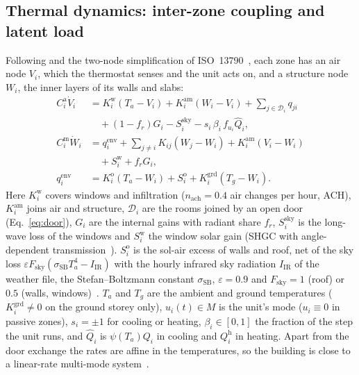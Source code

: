 \documentclass[10pt,a4paper,twocolumn]{article}
\theoremstyle{definition}
\begin{document}
\subsection{Thermal dynamics: inter-zone coupling and latent load}\label{sec:dynamics}
Following \citet{nghiem2012scalable} and the two-node simplification of ISO~13790~\citep{iso13790_2008}, each zone has an air node $V_i$, which the thermostat senses and the unit acts on, and a structure node $W_i$, the inner layers of its walls and slabs:
\begin{subequations}\label{eq:heat}
\begin{align}
C^{\mathrm{a}}_i\dot V_i&=K^{\mathrm{w}}_i(T_a-V_i)+K^{\mathrm{am}}_i(W_i-V_i)+\textstyle\sum_{j\in\mathcal{D}_i}q_{ji}\nonumber\\
&\quad+(1-f_r)G_i-S^{\mathrm{sky}}_i-s_i\,\beta_i\,f_{u_i}\hat Q_i,\label{eq:heat-a}\\
C^{\mathrm{m}}_i\dot W_i&=q^{\mathrm{env}}_i+\textstyle\sum_{j\ne i}K_{ij}(W_j-W_i)+K^{\mathrm{am}}_i(V_i-W_i)\nonumber\\
&\quad+S^{\mathrm{w}}_i+f_rG_i,\label{eq:heat-b}\\
q^{\mathrm{env}}_i&=K^{\mathrm{o}}_i(T_a-W_i)+S^{\mathrm{o}}_i+K^{\mathrm{grd}}_i(T_g-W_i).\label{eq:heat-c}
\end{align}
\end{subequations}
Here $K^{\mathrm{w}}_i$ covers windows and infiltration ($n_{\mathrm{ach}}=0.4$ air changes per hour, ACH), $K^{\mathrm{am}}_i$ joins air and structure, $\mathcal{D}_i$ are the rooms joined by an open door (Eq.~\eqref{eq:door}), $G_i$ are the internal gains with radiant share $f_r$, $S^{\mathrm{sky}}_i$ is the long-wave loss of the windows and $S^{\mathrm{w}}_i$ the window solar gain (SHGC with angle-dependent transmission~\citep{ashrae_fund2021}). $S^{\mathrm{o}}_i$ is the sol-air excess of walls and roof, net of the sky loss $\varepsilon F_{\text{sky}}(\sigma_{\text{SB}}T_a^4-I_{\text{IR}})$ with the hourly infrared sky radiation $I_{\text{IR}}$ of the weather file, the Stefan--Boltzmann constant $\sigma_{\text{SB}}$, $\varepsilon=0.9$ and $F_{\text{sky}}=1$ (roof) or $0.5$ (walls, windows)~\citep{iso13790_2008}. $T_a$ and $T_g$ are the ambient and ground temperatures ($K^{\mathrm{grd}}_i\ne0$ on the ground storey only), $u_i(t)\in M$ is the unit's mode ($u_i\equiv0$ in passive zones), $s_i=\pm1$ for cooling or heating, $\beta_i\in[0,1]$ the fraction of the step the unit runs, and $\hat Q_i$ is $\psi(T_a)Q_i$ in cooling and $Q^{\mathrm{h}}_i$ in heating. Apart from the door exchange the rates are affine in the temperatures, so the building is close to a linear-rate multi-mode system~\citep{wojtczak2013optimal}.
\end{document}
